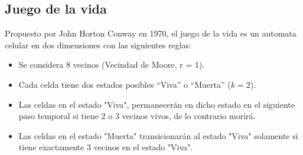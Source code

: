 \subsection{Juego de la vida}\label{subsec:juego-de-la-vida}
Propuesto por John Horton Conway en 1970\cite{gardner1970life}, el juego de la vida es un automata celular en dos dimensiones con las siguientes reglas\cite{toffoli1987cellular}:
\begin{itemize}
    \item Se considera 8 vecinos (Vecindad de Moore, r = 1).
    \item Cada celda tiene dos estados posibles “Viva” o “Muerta” ($k=2$).
    \item Las celdas en el estado "Viva", permanecerán en dicho estado en el siguiente paso temporal si tiene 2 o 3 vecinos vivos, de lo contrario morirá.
    \item Las celdas en el estado "Muerta" transicionarán al estado "Viva" solamente si tiene exactamente 3 vecinos en el estado "Viva".
\end{itemize}
